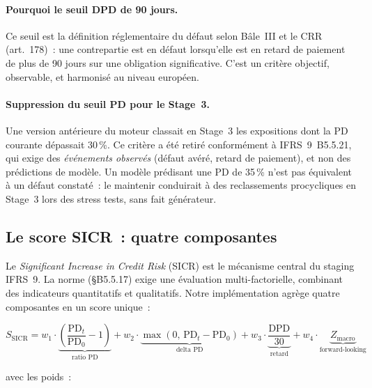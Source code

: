 \documentclass[12pt, a4paper, twoside, openright]{report}
\theoremstyle{definition}
\begin{document}
\paragraph{Pourquoi le seuil DPD de 90 jours.} Ce seuil est la définition réglementaire du défaut selon Bâle~III et le CRR (art.~178)~: une contrepartie est en défaut lorsqu'elle est en retard de paiement de plus de 90 jours sur une obligation significative. C'est un critère objectif, observable, et harmonisé au niveau européen.

\paragraph{Suppression du seuil PD pour le Stage~3.} Une version antérieure du moteur classait en Stage~3 les expositions dont la PD courante dépassait 30\,\%. Ce critère a été retiré conformément à IFRS~9~B5.5.21, qui exige des \emph{événements observés} (défaut avéré, retard de paiement), et non des prédictions de modèle. Un modèle prédisant une PD de 35\,\% n'est pas équivalent à un défaut constaté~: le maintenir conduirait à des reclassements procycliques en Stage~3 lors des stress tests, sans fait générateur.

\subsection{Le score SICR~: quatre composantes}

Le \emph{Significant Increase in Credit Risk} (SICR) est le mécanisme central du staging IFRS~9. La norme (§B5.5.17) exige une évaluation multi-factorielle, combinant des indicateurs quantitatifs et qualitatifs. Notre implémentation agrège quatre composantes en un score unique~:

\begin{equation}
S_{\text{SICR}} = w_1 \cdot \underbrace{\left(\frac{\text{PD}_t}{\text{PD}_0} - 1\right)}_{\text{ratio PD}} + w_2 \cdot \underbrace{\max(0,\, \text{PD}_t - \text{PD}_0)}_{\text{delta PD}} + w_3 \cdot \underbrace{\frac{\text{DPD}}{30}}_{\text{retard}} + w_4 \cdot \underbrace{Z_{\text{macro}}}_{\text{forward-looking}}
\label{eq:sicr}
\end{equation}

\noindent avec les poids~:
\end{document}
